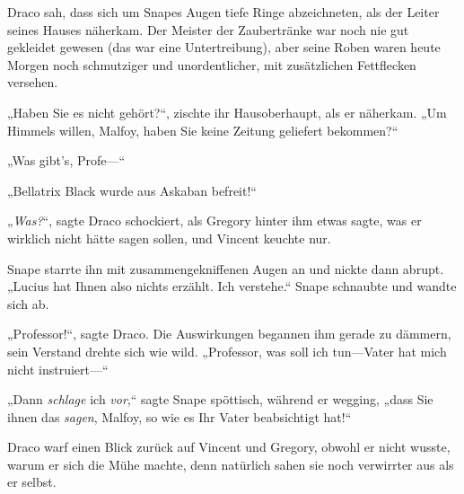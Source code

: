 Draco sah, dass sich um Snapes Augen tiefe Ringe abzeichneten, als der Leiter seines Hauses näherkam. Der Meister der Zaubertränke war noch nie gut gekleidet gewesen (das war eine Untertreibung), aber seine Roben waren heute Morgen noch schmutziger und unordentlicher, mit zusätzlichen Fettflecken versehen.

„Haben Sie es nicht gehört?“, zischte ihr Hausoberhaupt, als er näherkam. „Um Himmels willen, Malfoy, haben Sie keine Zeitung geliefert bekommen?“

„Was gibt’s, Profe—“

„Bellatrix Black wurde aus Askaban befreit!“

„\emph{Was?}“, sagte Draco schockiert, als Gregory hinter ihm etwas sagte, was er wirklich nicht hätte sagen sollen, und Vincent keuchte nur.

Snape starrte ihn mit zusammengekniffenen Augen an und nickte dann abrupt. „Lucius hat Ihnen also nichts erzählt. Ich verstehe.“ Snape schnaubte und wandte sich ab.

„Professor!“, sagte Draco. Die Auswirkungen begannen ihm gerade zu dämmern, sein Verstand drehte sich wie wild. „Professor, was soll ich tun—Vater hat mich nicht instruiert—“

„Dann \emph{schlage} ich \emph{vor},“ sagte Snape spöttisch, während er wegging, „dass Sie ihnen das \emph{sagen}, Malfoy, so wie es Ihr Vater beabsichtigt hat!“

Draco warf einen Blick zurück auf Vincent und Gregory, obwohl er nicht wusste, warum er sich die Mühe machte, denn natürlich sahen sie noch verwirrter aus als er selbst.

